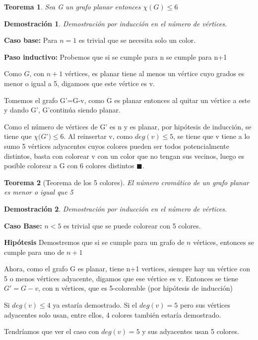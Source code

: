 \documentclass[a4paper,1pt]{report}
\newtheorem*{teo}{Teorema}
\newtheorem*{dem}{Demostración}
\begin{document}
\begin{teo}
 Sea G un grafo planar entonces $\chi(G)\leq 6$
\end{teo}

\begin{dem}
Demostración por inducción en el número de v\'ertices.
\end{dem}

\textbf{Caso base:} Para $n=1$ es trivial que se necesita solo un color.

\textbf{Paso inductivo:} Probemos que si se cumple para n se cumple para n+1

Como $G$, con $n+1$ vértices, es planar tiene al menos un vértice cuyo grados es menor o igual a 5, digamoes que este vértice es v.

Tomemos el grafo G'=G-v, como G es planar entonces al quitar un vértice a este y dando G', G'continúa siendo planar. 

Como el número de vértices de G' es n y es planar, por hipótesis de inducción, se tiene que 
$\chi(G$'$)\leq 6$. Al reinsertar v, como $deg(v)\leq 5$, se tiene que v tiene a lo sumo 5 vértices adyacentes cuyos colores pueden ser todos potencialmente distintos, basta con colorear v con un color que no tengan sus vecinos, luego es posible colorear a G con 6 colores distintos $\blacksquare$.

\begin{teo}[Teorema de los 5 colores] El número cromático de un grafo planar es menor o igual que 5 
\end{teo}

\begin{dem}
Demostración por inducción en el número de vértices.
\end{dem}

\textbf{Caso Base:} $n< 5$ es trivial que se puede colorear con 5 colores.

\textbf{Hip\'otesis} Demostremos que si se cumple para un grafo de $n$ v\'ertices, entonces se cumple para uno de $n+1$

Ahora, como el grafo G es planar, tiene n+1 vertices, siempre hay un vértice con 5 o menos vértices adyacente, digamos que ese vértice es v. Entonces se tiene $G'= G-v$, con n vértices, que es 5-coloreable (por hipótesis de inducción)

Si $deg(v)\leq 4$ ya estaría demostrado. 
Si el $deg(v)=5$ pero sus vértices adyacentes solo usan, entre ellos, 4 colores también estaría demostrado.

Tendríamos que ver el caso con $deg(v)=5$ y sus adyacentes usan 5 colores.
\end{document}
